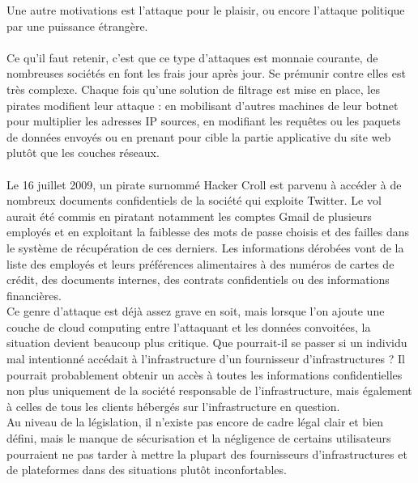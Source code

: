 \documentclass[a4paper,12pt]{report}
\begin{document}
\begin{onehalfspace}
Une autre motivations est l'attaque pour le plaisir, ou encore l'attaque politique par une puissance étrangère.

	\paragraph*{} 
	Ce qu'il faut retenir, c'est que ce type d'attaques est monnaie courante, de nombreuses sociétés en font les frais jour après jour. Se prémunir contre elles est très complexe. Chaque fois qu'une solution de filtrage est mise en place, les pirates modifient leur attaque : en mobilisant d'autres machines de leur botnet pour multiplier les adresses IP sources, en modifiant les requêtes ou les paquets de données envoyés ou en prenant pour cible la partie applicative du site web plutôt que les couches réseaux.
	
	\paragraph*{}
	Le 16 juillet 2009, un pirate surnommé Hacker Croll est parvenu à accéder à de nombreux documents confidentiels de la société qui exploite Twitter. Le vol aurait été commis en piratant notamment les comptes Gmail de plusieurs employés et en exploitant la faiblesse des mots de passe choisis
et des failles dans le système de récupération de ces derniers. Les informations dérobées vont de la liste des employés et leurs préférences alimentaires à des numéros de cartes de crédit, des documents internes, des contrats confidentiels ou des informations financières. \\
Ce genre d'attaque est déjà assez grave en soit, mais lorsque l'on ajoute une couche de cloud computing entre l'attaquant et les données convoitées, la situation devient beaucoup plus critique. Que pourrait-il se passer si un individu mal intentionné accédait à l'infrastructure d'un fournisseur d'infrastructures ? Il pourrait probablement obtenir un accès à toutes les informations confidentielles non plus uniquement de la société responsable de l'infrastructure, mais également à celles de tous les clients hébergés sur l'infrastructure en question.\\
Au niveau de la législation, il n'existe pas encore de cadre légal clair et bien défini, mais le manque de sécurisation et la négligence de certains utilisateurs pourraient ne pas
tarder à mettre la plupart des fournisseurs d'infrastructures et de plateformes dans des
situations plutôt inconfortables.


\end{onehalfspace}
\end{document}
